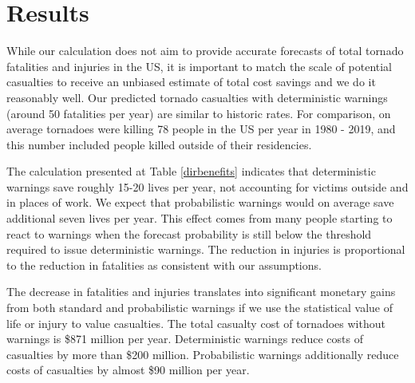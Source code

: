 \documentclass{ametsocV6.1}
\begin{document}
\section{Results}

While our calculation does not aim to provide accurate forecasts of total tornado fatalities and injuries in the US, it is important to match the scale of potential casualties to receive an unbiased estimate of total cost savings and we do it reasonably well.  Our predicted tornado casualties with deterministic warnings (around 50 fatalities per year) are similar to historic rates. For comparison, on average tornadoes were killing 78 people in the US per year in 1980 - 2019, and this number included people killed outside of their residencies.  

The calculation presented at Table \ref{dirbenefits} indicates that deterministic warnings save roughly 15-20 lives per year, not accounting for victims outside and in places of work. We expect that probabilistic warnings would on average save additional seven lives per year. This effect comes from many people starting to react to warnings when the forecast probability is still below the threshold required to issue deterministic warnings. The reduction in injuries is proportional to the reduction in fatalities as consistent with our assumptions.

The decrease in fatalities and injuries translates into significant monetary gains from both standard and probabilistic warnings if we use the statistical value of life or injury to value casualties. The total casualty cost of tornadoes without warnings is \$871 million per year. Deterministic warnings reduce costs of casualties by more than \$200 million. Probabilistic warnings additionally reduce costs of casualties by almost \$90 million per year.


\end{document}
